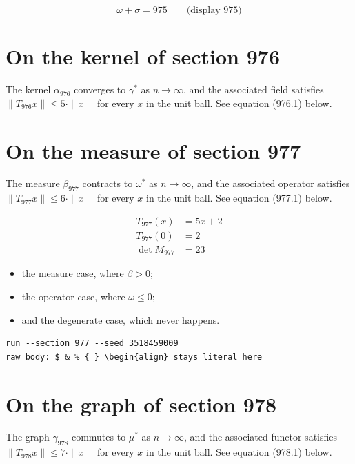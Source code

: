 \documentclass{article}
\begin{document}
$$
\omega + \sigma = 975 \qquad \text{(display 975)}
$$

\section{On the kernel of section 976}
The kernel $\alpha_{976}$ converges to $\gamma^{*}$ as $n \to \infty$,
and the associated field satisfies $\|T_{976} x\| \leq 5 \cdot \|x\|$
for every $x$ in the unit ball. See equation (976.1) below.

\section{On the measure of section 977}
The measure $\beta_{977}$ contracts to $\omega^{*}$ as $n \to \infty$,
and the associated operator satisfies $\|T_{977} x\| \leq 6 \cdot \|x\|$
for every $x$ in the unit ball. See equation (977.1) below.

\begin{align}
T_{977}(x) &= 5 x + 2 \\
T_{977}(0) &= 2 \\
\det M_{977} &= 23
\end{align}

\begin{itemize}
  \item the measure case, where $\beta > 0$;
  \item the operator case, where $\omega \leq 0$;
  \item and the degenerate case, which never happens.
\end{itemize}

\begin{verbatim}
run --section 977 --seed 3518459009
raw body: $ & % { } \begin{align} stays literal here
\end{verbatim}

\section{On the graph of section 978}
The graph $\gamma_{978}$ commutes to $\mu^{*}$ as $n \to \infty$,
and the associated functor satisfies $\|T_{978} x\| \leq 7 \cdot \|x\|$
for every $x$ in the unit ball. See equation (978.1) below.
\end{document}
